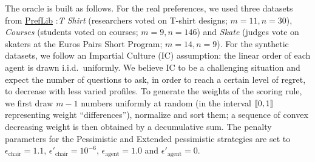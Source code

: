 \documentclass{article}
\begin{document}
The oracle is built as follows. 
For the real preferences, we used three datasets from \href{https://www.preflib.org/}{PrefLib} \citep{PrefLib}:\textit{T Shirt} (researchers voted on T-shirt designs; $m \!=\! 11, n \!=\! 30$),
\textit{Courses}  (students voted on courses; $m \!=\! 9, n \!=\! 146$)
and \emph{Skate} (judges vote on skaters at the Euros Pairs Short Program; $m \!=\! 14, n \!=\! 9$).
For the synthetic datasets, we follow an Impartial Culture (IC) assumption: the linear order of each agent is drawn i.i.d.\ uniformly.
We believe IC to be a challenging situation and expect the number of questions to ask, in order to reach a certain level of regret, to decrease with less varied profiles.
To generate the weights of the scoring rule, we first draw $m \!-\! 1$ numbers uniformly at random (in the interval $\llbracket 0,1 \rrbracket$ representing weight ``differences''), normalize and sort them; a sequence of convex decreasing weight is then obtained by a decumulative sum. The penalty parameters for the Pessimistic and Extended pessimistic strategies are set to  $\epsilon_{\text{chair}} = 1.1$, $\epsilon'_{\text{chair}} = 10^{-6}$, $\epsilon_{\text{agent}} = 1.0$ and $\epsilon'_{\text{agent}} = 0$.
\end{document}
